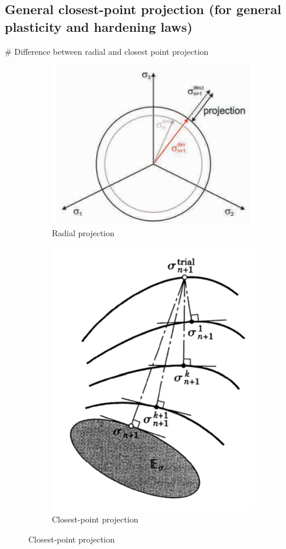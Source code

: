 \documentclass[]{scrartcl}
\begin{document}
\subsection{General closest-point projection (for general plasticity and hardening laws)}
\begin{easylist}
# Difference between radial and closest point projection
\begin{figure}[!htb]
\centering
\begin{subfigure}[t]{0.45\textwidth}
\includegraphics[width=0.8\linewidth]{Figures/Sec_3_5_1-Radial_projection}
\caption{Radial projection \citep{Mergheim2018a}}
\label{fig:sec351-radialprojection}
\end{subfigure}
\quad
\begin{subfigure}[t]{0.45\textwidth}
\includegraphics[width=0.8\linewidth]{Figures/Sec_3_5_2-General_closest_point_projection}
\caption{Closest-point projection \citep{Simo2006a}}
\label{fig:sec352-generalclosestpointprojection}
\end{subfigure}
\end{figure}
\end{easylist}
\end{document}
